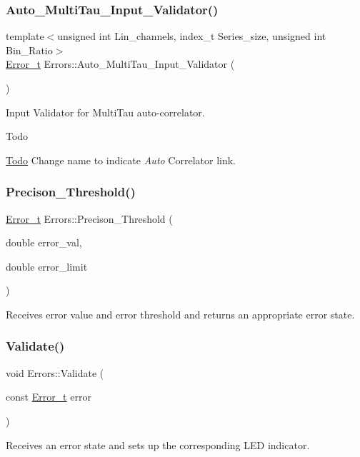 \subsubsection{\texorpdfstring{Auto\+\_\+\+Multi\+Tau\+\_\+\+Input\+\_\+\+Validator()}{Auto\_MultiTau\_Input\_Validator()}}
{\footnotesize\ttfamily template$<$unsigned int Lin\+\_\+channels, index\+\_\+t Series\+\_\+size, unsigned int Bin\+\_\+\+Ratio$>$ \\
\hyperlink{errors_8hpp_a4e8c0d09726859e3d3369c0da5a1aa7f}{Error\+\_\+t} Errors\+::\+Auto\+\_\+\+Multi\+Tau\+\_\+\+Input\+\_\+\+Validator (\begin{DoxyParamCaption}{ }\end{DoxyParamCaption})}



Input Validator for Multi\+Tau auto-\/correlator. 

\begin{DoxyRefDesc}{Todo}
\item[\hyperlink{todo__todo000001}{Todo}]Change name to indicate {\itshape Auto} Correlator link. \end{DoxyRefDesc}
\mbox{\label{namespaceErrors_a13171d3d324164c9f7a9508d5a16b0c5}} 
\subsubsection{\texorpdfstring{Precison\+\_\+\+Threshold()}{Precison\_Threshold()}}
{\footnotesize\ttfamily \hyperlink{errors_8hpp_a4e8c0d09726859e3d3369c0da5a1aa7f}{Error\+\_\+t} Errors\+::\+Precison\+\_\+\+Threshold (\begin{DoxyParamCaption}\item[{double}]{error\+\_\+val,  }\item[{double}]{error\+\_\+limit }\end{DoxyParamCaption})}



Receives error value and error threshold and returns an appropriate error state. 

\mbox{\label{namespaceErrors_a1fcd582e2074f8fad3a450d1b6b42aaa}} 
\subsubsection{\texorpdfstring{Validate()}{Validate()}}
{\footnotesize\ttfamily void Errors\+::\+Validate (\begin{DoxyParamCaption}\item[{const \hyperlink{errors_8hpp_a4e8c0d09726859e3d3369c0da5a1aa7f}{Error\+\_\+t}}]{error }\end{DoxyParamCaption})}



Receives an error state and sets up the corresponding L\+ED indicator. 


